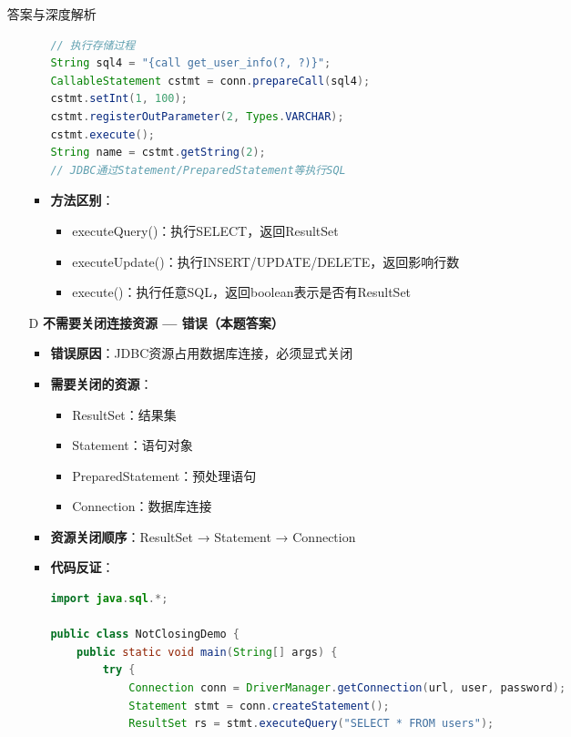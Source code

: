 \documentclass[12pt, a4paper]{ctexart}
\begin{document}
\begin{enumerate}[label=\textbf{\arabic*.}]
\begin{bluebox}{答案与深度解析}
\begin{itemize}[leftmargin=*, nosep, label={}]
\begin{itemize}[label={}, leftmargin=*, nosep]
\begin{lstlisting}[language=Java]
// 执行存储过程
String sql4 = "{call get_user_info(?, ?)}";
CallableStatement cstmt = conn.prepareCall(sql4);
cstmt.setInt(1, 100);
cstmt.registerOutParameter(2, Types.VARCHAR);
cstmt.execute();
String name = cstmt.getString(2);
// JDBC通过Statement/PreparedStatement等执行SQL
				      \end{lstlisting}
				            \item \textbf{方法区别}：
				                  \begin{itemize}[label={}, nosep]
					                  \item executeQuery()：执行SELECT，返回ResultSet
					                  \item executeUpdate()：执行INSERT/UPDATE/DELETE，返回影响行数
					                  \item execute()：执行任意SQL，返回boolean表示是否有ResultSet
				                  \end{itemize}
			            \end{itemize}

			      \item[D] \textbf{不需要关闭连接资源 — 错误（本题答案）}
			            \begin{itemize}[label={}, leftmargin=*, nosep]
				            \item \textbf{错误原因}：JDBC资源占用数据库连接，必须显式关闭
				            \item \textbf{需要关闭的资源}：
				                  \begin{itemize}[label={}, nosep]
					                  \item ResultSet：结果集
					                  \item Statement：语句对象
					                  \item PreparedStatement：预处理语句
					                  \item Connection：数据库连接
				                  \end{itemize}
				            \item \textbf{资源关闭顺序}：ResultSet → Statement → Connection
				            \item \textbf{代码反证}：
				                  \begin{lstlisting}[language=Java]
import java.sql.*;

public class NotClosingDemo {
    public static void main(String[] args) {
        try {
            Connection conn = DriverManager.getConnection(url, user, password);
            Statement stmt = conn.createStatement();
            ResultSet rs = stmt.executeQuery("SELECT * FROM users");


\end{lstlisting}
\end{itemize}
\end{itemize}
\end{bluebox}
\end{enumerate}
\end{document}
